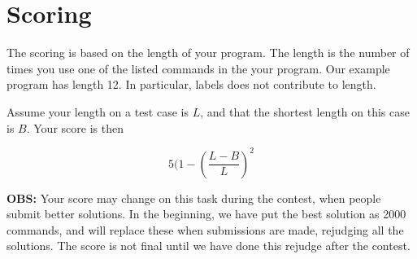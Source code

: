 \section*{Scoring}
The scoring is based on the length of your program. The length is the number of times you use one of the listed commands in the your program. Our example program has length 12. In particular, labels does not contribute to length.

Assume your length on a test case is $L$, and that the shortest length on this case is $B$. Your score is then

\[ 5 (1 - (\frac{L - B}{L})^2\]

\textbf{OBS:} Your score may change on this task during the contest, when people submit better solutions. In the beginning, we have put the best solution as 2000 commands, and will replace these when submissions are made, rejudging all the solutions. The score is not final until we have done this rejudge after the contest.
